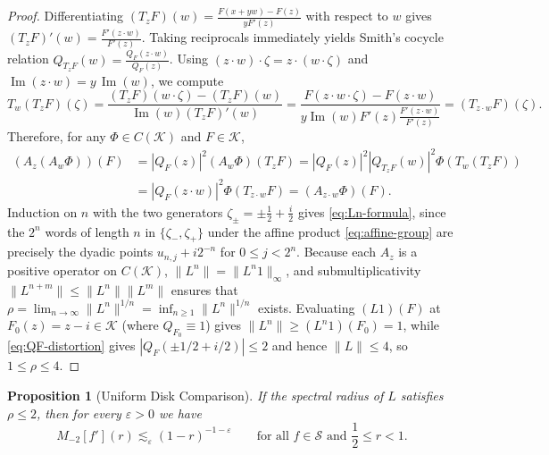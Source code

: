 \documentclass[12pt]{article}
\def\K{\mathcal{K}}
\def\S{\mathcal{S}}
\newtheorem{prop}[thm]{Proposition}
\theoremstyle{definition}
\numberwithin{equation}{section}
\begin{document}
\begin{proof}
Differentiating $(T_z F)(w) = \frac{F(x+yw) - F(z)}{y F'(z)}$ with respect to $w$ gives $(T_z F)'(w) = \frac{F'(z \cdot w)}{F'(z)}$. Taking reciprocals immediately yields Smith's cocycle relation $Q_{T_z F}(w) = \frac{Q_F(z \cdot w)}{Q_F(z)}$. Using $(z \cdot w) \cdot \zeta = z \cdot (w \cdot \zeta)$ and $\operatorname{Im}(z \cdot w) = y \, \operatorname{Im}(w)$, we compute
\[
  T_w(T_z F)(\zeta) = \frac{(T_z F)(w \cdot \zeta) - (T_z F)(w)}{\operatorname{Im}(w) (T_z F)'(w)} = \frac{F(z \cdot w \cdot \zeta) - F(z \cdot w)}{y \operatorname{Im}(w) F'(z) \frac{F'(z \cdot w)}{F'(z)}} = (T_{z \cdot w} F)(\zeta).
\]
Therefore, for any $\Phi \in C(\K)$ and $F \in \K$,
\[
\begin{aligned}
  (A_z(A_w \Phi))(F) &= |Q_F(z)|^2 (A_w \Phi)(T_z F) = |Q_F(z)|^2 |Q_{T_z F}(w)|^2 \Phi(T_w(T_z F)) \\
  &= |Q_F(z \cdot w)|^2 \Phi(T_{z \cdot w} F) = (A_{z \cdot w}\Phi)(F).
\end{aligned}
\]
Induction on $n$ with the two generators $\zeta_\pm = \pm \frac{1}{2} + \frac{i}{2}$ gives \eqref{eq:Ln-formula}, since the $2^n$ words of length $n$ in $\{\zeta_-, \zeta_+\}$ under the affine product \eqref{eq:affine-group} are precisely the dyadic points $u_{n, j} + i 2^{-n}$ for $0 \le j < 2^n$. Because each $A_z$ is a positive operator on $C(\K)$, $\|L^n\| = \|L^n 1\|_\infty$, and submultiplicativity $\|L^{n+m}\| \le \|L^n\|\|L^m\|$ ensures that $\rho = \lim_{n\to\infty} \|L^n\|^{1/n} = \inf_{n\ge 1} \|L^n\|^{1/n}$ exists. Evaluating $(L 1)(F)$ at $F_0(z) = z - i \in \K$ (where $Q_{F_0} \equiv 1$) gives $\|L^n\| \ge (L^n 1)(F_0) = 1$, while \eqref{eq:QF-distortion} gives $|Q_F(\pm 1/2 + i/2)| \le 2$ and hence $\|L\| \le 4$, so $1 \le \rho \le 4$.
\end{proof}

\begin{prop}[Uniform Disk Comparison]\label{prop:disk-comparison}
If the spectral radius of $L$ satisfies $\rho \le 2$, then for every $\varepsilon > 0$ we have
\begin{equation}\label{eq:prop-disk-comparison}
  M_{-2}[f'](r) \lesssim_\varepsilon (1-r)^{-1-\varepsilon} \qquad \text{for all } f \in \S \text{ and } \frac{1}{2} \le r < 1.
\end{equation}
\end{prop}
\end{document}
